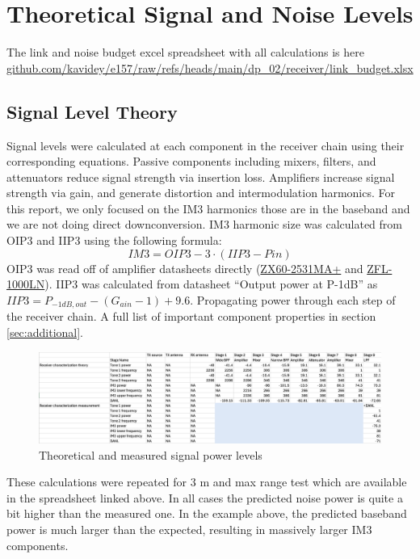 \documentclass[letterpaper,12pt]{article}
\begin{document}
\newpage
\section{Theoretical Signal and Noise Levels} \label{sec:sig_and_noise}
The link and noise budget excel spreadsheet with all calculations is here \url{github.com/kavidey/e157/raw/refs/heads/main/dp_02/receiver/link_budget.xlsx}
\subsection{Signal Level Theory}
Signal levels were calculated at each component in the receiver chain using their corresponding equations. Passive components including mixers, filters, and attenuators reduce signal strength via insertion loss. Amplifiers increase signal strength via gain, and generate distortion and intermodulation harmonics. For this report, we only focused on the IM3 harmonics those are in the baseband and we are not doing direct downconversion. IM3 harmonic size was calculated from OIP3 and IIP3 using the following formula:
$$
IM3 = OIP3 - 3 \cdot (IIP3 - Pin)
$$
OIP3 was read off of amplifier datasheets directly (\href{https://www.mouser.com/datasheet/2/1030/ZX60-2531MA_2b-1701661.pdf}{ZX60-2531MA+} and \href{https://www.mouser.com/datasheet/2/1030/ZFL_1000LN_2b-2303490.pdf}{ZFL-1000LN}). IIP3 was calculated from datasheet ``Output power at P-1dB'' as $IIP3 = P_{-1dB,out} - (G_{ain} - 1) + 9.6$. Propagating power through each step of the receiver chain. A full list of important component properties in section \ref{sec:additional}.
\begin{figure}[H]
	\begin{centering}
		\includegraphics[width=1\columnwidth]{figures/signal_theory}
		\caption{Theoretical and measured signal power levels}
	\end{centering}
\end{figure}
\noindent
These calculations were repeated for 3 m and max range test which are available in the spreadsheet linked above. In all cases the predicted noise power is quite a bit higher than the measured one. In the example above, the predicted baseband power is much larger than the expected, resulting in massively larger IM3 components.
\end{document}
